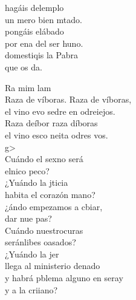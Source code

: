 \begin{cancion}%
	 hagáis delemplo\\
	un mero bien mtado.\\
	 pongáis elábado\\
	por ena del ser huno.\\
	 domestiqis la Pabra\\
	que os da.\jump\\
	\begin{chorus}%
	        Ra     mim       lam\\
	Raza de víboras. Raza de víboras,\\
		el vino evo sedre en odreiejos.\\
		Raza deíbor raza díboras\\
		el vino esco neita odres vos.\\
		g>   \\
		Cuándo el sexno será\\
		elnico peco?\\
		¿Yuándo la jticia \\
		habita el corazón mano?\\
		¿ándo empezamos a cbiar,\\
		dar nue pas?\\
	\jump
		Cuándo nuestrocuras\\
		seránlibes oasados?\\
		¿Yuándo la jer \\
		llega al ministerio denado\\
		y  habrá pblema alguno en seray\\
		y a la  criiano?\jump\\
	\begin{chorus}%

\end{chorus}
\end{chorus}
\end{cancion}
